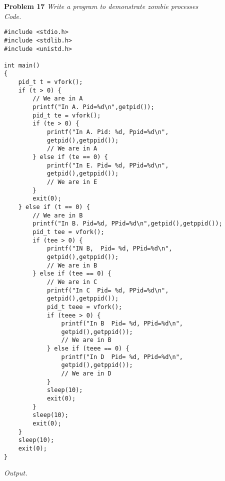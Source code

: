 \documentclass[12pt]{article}
\begin{document}
\textbf{Problem 17} \textit{Write a program to demonstrate zombie processes}\\

\textit{Code.}

\begin{lstlisting}
#include <stdio.h>
#include <stdlib.h>
#include <unistd.h>

int main()
{
	pid_t t = vfork();
	if (t > 0) {
		// We are in A
		printf("In A. Pid=%d\n",getpid());
		pid_t te = vfork();
		if (te > 0) {
			printf("In A. Pid: %d, Ppid=%d\n",
			getpid(),getppid());
			// We are in A
		} else if (te == 0) {
			printf("In E. Pid= %d, PPid=%d\n",
			getpid(),getppid());
			// We are in E
		}
		exit(0);
	} else if (t == 0) {
		// We are in B
		printf("In B. Pid=%d, PPid=%d\n",getpid(),getppid());
		pid_t tee = vfork();
		if (tee > 0) {
			printf("IN B,  Pid= %d, PPid=%d\n",
			getpid(),getppid());
			// We are in B
		} else if (tee == 0) {
			// We are in C
			printf("In C  Pid= %d, PPid=%d\n",
			getpid(),getppid());
			pid_t teee = vfork();
			if (teee > 0) {
				printf("In B  Pid= %d, PPid=%d\n",
				getpid(),getppid());
				// We are in B
			} else if (teee == 0) {
				printf("In D  Pid= %d, PPid=%d\n",
				getpid(),getppid());
				// We are in D
			}
			sleep(10);
			exit(0);
		}
		sleep(10);
		exit(0);
	}
	sleep(10);
	exit(0);
}
\end{lstlisting}

\textit{Output.}
\begin{lstlisting}
\end{lstlisting}
\end{document}
